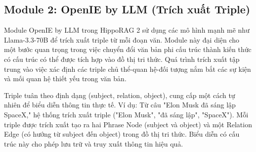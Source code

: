 \documentclass[../main.tex]{subfiles}
\begin{document}




\subsection{Module 2: OpenIE by LLM (Trích xuất Triple)}
Module OpenIE by LLM trong HippoRAG 2 sử dụng các mô hình mạnh mẽ như Llama-3.3-70B để trích xuất triple từ mỗi đoạn văn. Module này đại diện cho một bước quan trọng trong việc chuyển đổi văn bản phi cấu trúc thành kiến thức có cấu trúc có thể được tích hợp vào đồ thị tri thức. Quá trình trích xuất tập trung vào việc xác định các triple chủ thể-quan hệ-đối tượng nắm bắt các sự kiện và mối quan hệ thiết yếu trong văn bản.

Triple tuân theo định dạng (subject, relation, object), cung cấp một cách tự nhiên để biểu diễn thông tin thực tế. Ví dụ: Từ câu "Elon Musk đã sáng lập SpaceX," hệ thống trích xuất triple ("Elon Musk", "đã sáng lập", "SpaceX"). Mỗi triple được trích xuất tạo ra hai Phrase Node (subject và object) và một Relation Edge (có hướng từ subject đến object) trong đồ thị tri thức. Biểu diễn có cấu trúc này cho phép lưu trữ và truy xuất thông tin hiệu quả.
\end{document}
